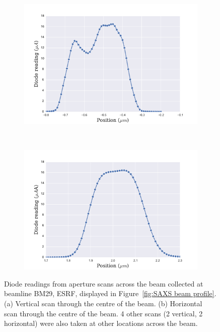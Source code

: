 \begin{figure}
    \centering
    \begin{subfigure}[b]{0.9\textwidth}
            \centering
            \includegraphics[width=\textwidth]{figures/beam/SAXS_vertical_aperture_scan.pdf}
            \caption{}
            \label{fig:Vertical aperture scans - Beam processing chapter}
    \end{subfigure}
    \\
    \begin{subfigure}[b]{0.9\textwidth}
            \centering
            \includegraphics[width=\textwidth]{figures/beam/SAXS_horizontal_aperture_scan.pdf}
            \caption{}
            \label{fig:Horizontal aperture scans - Beam processing chapter}
    \end{subfigure}
    \caption[Diode readings from aperture scans across the beam collected at beamline BM29, ESRF.]{Diode readings from aperture scans across the beam collected at beamline BM29, ESRF, displayed in Figure~\ref{fig:SAXS beam profile}. (a) Vertical scan through the centre of the beam. (b) Horizontal scan through the centre of the beam. 4 other scans (2 vertical, 2 horizontal) were also taken at other locations across the beam.}
    \label{fig:Aperture scans - Beam processing chapter}
\end{figure}

